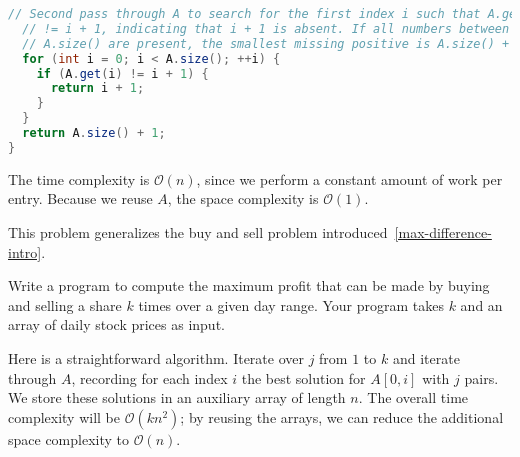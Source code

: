 \documentclass[10pt,openany,twoside,letterpaper,extrafontsizes]{memoir}
\newif\ifPython
\newcommand{\myindex}[1]{%
\index[terms]{#1}%
}
\begin{document}
\begin{Spacing}{\honorsSpacing}
\begin{lstlisting}[language=Java]
  // Second pass through A to search for the first index i such that A.get(i)
  // != i + 1, indicating that i + 1 is absent. If all numbers between 1 and
  // A.size() are present, the smallest missing positive is A.size() + 1.
  for (int i = 0; i < A.size(); ++i) {
    if (A.get(i) != i + 1) {
      return i + 1;
    }
  }
  return A.size() + 1;
}
\end{lstlisting}
\fi%
\ifPython
\begin{lstlisting}[language=Python]
def find_first_missing_positive(A):
    # Record which values are present by writing A[i] to index A[i] - 1 if
    # A[i] is between 1 and len(A), inclusive. We save the value at index A[i]
    # - 1 by swapping it with the entry at i. If A[i] is negative or greater
    # than n, we just advance i.
    for i in range(len(A)):
        while 1 <= A[i] <= len(A) and A[i] != A[A[i] - 1]:
            A[A[i] - 1], A[i] = A[i], A[A[i] - 1]

    # Second pass through A to search for the first index i such that A[i] !=
    # i+1, indicating that i + 1 is absent. If all numbers between 1 and
    # len(A) are present, the smallest missing positive is len(A) + 1.
    return next((i + 1 for i, a in enumerate(A) if a != i + 1), len(A) + 1)
\end{lstlisting}
\fi%
The time complexity is $\mathcal{O}(n)$, since we perform a constant amount of work
per entry. Because we reuse $A$, the space complexity is \myindex{$\mathcal{O}(1)$ space}$\mathcal{O}(1)$.
\ansend


\label{max-difference-k}
This problem generalizes the buy and sell problem introduced~\vref{max-difference-intro}.



%
Write a program to compute the maximum profit that can be made by buying and selling a share $k$ times over a given day range.
Your program takes $k$ and an array of daily stock prices as input.





\label{solution-max-difference-k}
Here is a straightforward algorithm.
Iterate over $j$ from $1$ to $k$ and iterate
through $A$, recording
for each index $i$ the best solution for $A[0,i]$ with $j$ pairs. We store these
solutions in an auxiliary \myindex{array}array of length $n$. The overall time complexity will be $\mathcal{O}(kn^2)$;
by reusing the \myindex{array}arrays, we can reduce the additional space complexity to $\mathcal{O}(n)$.


\end{Spacing}
\end{document}
